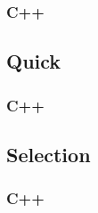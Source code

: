 \documentclass{article}
\begin{document}
\begin{appendices}
\subsubsection{C++}

\newpage
\subsection{Quick}
\label{code:quick}
\subsubsection{C++}

\newpage
\subsection{Selection}
\label{code:selection}
\subsubsection{C++}

\end{appendices}
\end{document}
